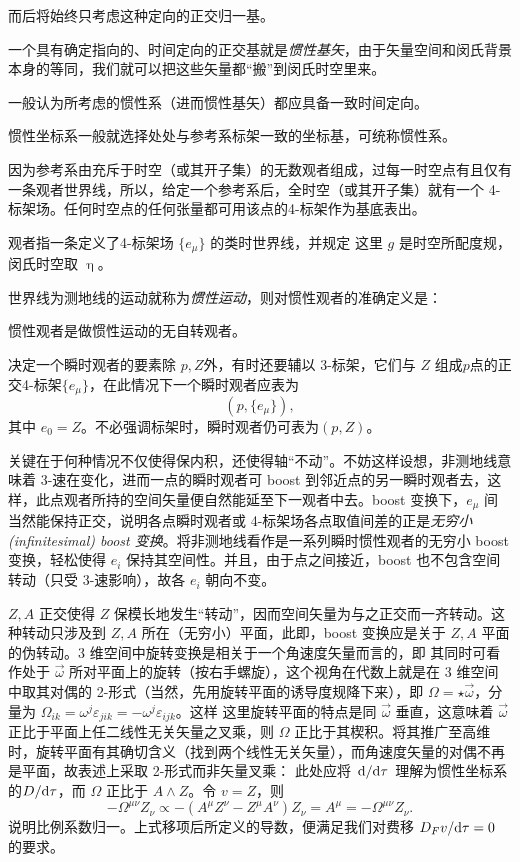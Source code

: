 

    而后将始终只考虑这种定向的正交归一基。

一个具有确定指向的、时间定向的正交基就是\textit{惯性基矢}，由于矢量空间和闵氏背景本身的等同，我们就可以把这些矢量都“搬”到闵氏时空里来。

一般认为所考虑的惯性系（进而惯性基矢）都应具备一致时间定向。
    


惯性坐标系一般就选择处处与参考系标架一致的坐标基，可统称惯性系。

因为参考系由充斥于时空（或其开子集）的无数观者组成，过每一时空点有且仅有一条观者世界线，所以，给定一个参考系后，全时空（或其开子集）就有一个 4-标架场。任何时空点的任何张量都可用该点的4-标架作为基底表出。
\begin{definition}[观者]
    观者指一条定义了4-标架场 $\{e_\mu\}$ 的类时世界线，并规定
    这里 $g$ 是时空所配度规，闵氏时空取 $\upeta$。
\end{definition}
世界线为测地线的运动就称为\textit{惯性运动}，则对惯性观者的准确定义是：
\begin{definition}[惯性观者]
    惯性观者是做惯性运动的无自转观者。
\end{definition}

决定一个瞬时观者的要素除 $p,Z$外，有时还要辅以 3-标架，它们与 $Z$ 组成$p$点的正交4-标架$\{e_\mu\}$，在此情况下一个瞬时观者应表为
\[(p,\{e_\mu\}),\]
其中 $e_0=Z$。不必强调标架时，瞬时观者仍可表为$(p,Z)$。


关键在于何种情况不仅使得保内积，还使得轴“不动”。不妨这样设想，非测地线意味着 3-速在变化，进而一点的瞬时观者可 boost 到邻近点的另一瞬时观者去，这样，此点观者所持的空间矢量便自然能延至下一观者中去。boost 变换下，$e_\mu$ 间当然能保持正交，说明各点瞬时观者或 4-标架场各点取值间差的正是\textit{无穷小(infinitesimal) boost 变换}。将非测地线看作是一系列瞬时惯性观者的无穷小 boost 变换，轻松使得 $e_i$ 保持其空间性。并且，由于点之间接近，boost 也不包含空间转动（只受 3-速影响），故各 $e_i$ 朝向不变。

$Z,A$ 正交使得 $Z$ 保模长地发生“转动”，因而空间矢量为与之正交而一齐转动。这种转动只涉及到 $Z,A$ 所在（无穷小）平面，此即，boost 变换应是关于 $Z,A$ 平面的伪转动。3 维空间中旋转变换是相关于一个角速度矢量而言的，即
其同时可看作处于 $\vec\omega$ 所对平面上的旋转（按右手螺旋），这个视角在代数上就是在 3 维空间中取其对偶的 2-形式（当然，先用旋转平面的诱导度规降下来），即 $\Omega=\star\vec\omega$，分量为 $\Omega_{ik}=\omega^j\varepsilon_{jik}=-\omega^j\varepsilon_{ijk}$。这样
这里旋转平面的特点是同 $\vec\omega$ 垂直，这意味着 $\vec\omega$ 正比于平面上任二线性无关矢量之叉乘，则 $\Omega$ 正比于其楔积。将其推广至高维时，旋转平面有其确切含义（找到两个线性无关矢量），而角速度矢量的对偶不再是平面，故表述上采取 2-形式而非矢量叉乘：
此处应将 $\dv*{\tau}$ 理解为惯性坐标系的$D/\dd\tau$，而 $\Omega$ 正比于 $A\wedge Z$。令 $v=Z$，则
\[
-\Omega^{\mu\nu} Z_\nu\propto -(A^\mu Z^\nu-Z^\mu A^\nu)Z_\nu=A^\mu=-\Omega^{\mu\nu} Z_\nu.
\]
说明比例系数归一。上式移项后所定义的导数，便满足我们对费移 $D_F v/\dd\tau=0$ 的要求。


